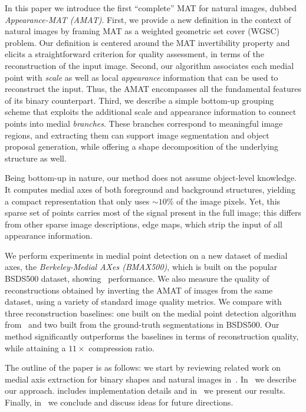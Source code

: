 \documentclass[10pt,twocolumn,letterpaper]{article}
\begin{document}
In this paper we introduce the first ``complete'' MAT for natural images, dubbed \emph{Appearance-MAT (AMAT)}.
First, we provide a new definition in the context of natural images by framing MAT 
as a weighted geometric set cover (WGSC) problem.
Our definition is centered around the MAT invertibility property and elicits 
a straightforward criterion for quality assessment, in terms of the reconstruction of the input image.
Second, our algorithm associates each medial point with \emph{scale} as well as local \emph{appearance} information
that can be used to reconstruct the input.
Thus, the AMAT encompasses all the fundamental features of its  binary counterpart. 
Third, we describe a simple bottom-up grouping scheme that exploits the additional scale and appearance information to connect
points into medial \emph{branches}.
These branches correspond to meaningful image regions, and extracting them can support image segmentation
and object proposal generation, while offering a shape decomposition of the underlying structure as well. 

Being bottom-up in nature, our method does not assume object-level knowledge.
It computes medial axes of both foreground and background structures, 
yielding a compact representation that only uses $\sim 10\%$ of the image pixels.
Yet, this sparse set of points carries most of the signal present in the full image;
this differs from other sparse image descriptions, \eg edge maps, which strip the input of all appearance information.

We perform experiments in medial point detection on a new dataset of medial axes, the 
\emph{Berkeley-Medial AXes (BMAX500)}, which is built on the popular BSDS500 dataset, showing \sota\ performance.
We also measure the quality of reconstructions  obtained by inverting the AMAT of images from the same dataset, 
using  a variety of standard image quality metrics.
We compare with three reconstruction baselines: one built on the medial point detection algorithm from~\cite{tsogkas2012learning}
and two built from the ground-truth segmentations in BSDS500.
Our method significantly outperforms the baselines in terms of reconstruction quality, while attaining a $11\times$ compression ratio.

The outline of the paper is as follows: we start by reviewing related work on medial axis extraction for binary shapes
and natural images in~.
In~ we describe our approach.
 includes implementation details and in~ we present our results.
Finally, in~ we conclude and discuss ideas for future directions.
\end{document}
